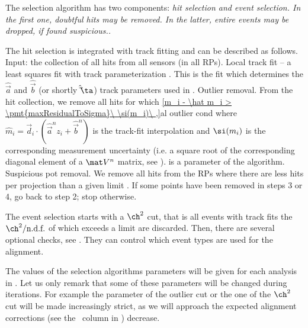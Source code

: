 The selection algorithm has two components: \em{hit selection} and \em{event selection}. In the first one, doubtful hits may be removed. In the latter, entire events may be dropped, if found suspicious..

The hit selection is integrated with track fitting and can be described as follows.
\bitm
\itm Input: the collection of all hits from all sensors (in all RPs).
\itm Local track fit -- a least squares fit with track parameterization . This is the fit which determines the $\hat\vec a$ and $\hat\vec b$ (or shortly $\hat\vec\ta$) track parameters used in .
\itm Outlier removal. From the hit collection, we remove all hits for which
\eqref{m_i - \hat m_i > \pmt{maxResidualToSigma}\ \si(m_i)\ ,}{al outlier cond}
where $\hat m_i = \vec d_i \cdot (\hat\vec a^n z_i + \hat\vec b^n)$ is the track-fit interpolation and $\si(m_i)$ is the corresponding measurement uncertainty (i.e. a square root of the corresponding diagonal element of a $\mat V^n$ matrix, see ).  is a parameter of the algorithm.
\itm Suspicious pot removal. We remove all hits from the RPs where there are less hits per projection than a given limit .
\itm If some points have been removed in steps 3 or 4, go back to step 2; stop otherwise.
\eitm

The event selection starts with a $\ch^2$ cut, that is all events with track fits the $\ch^2/\hbox{n.d.f.}$ of which exceeds a limit  are discarded. Then, there are several optional checks, see . They can control which event types are used for the alignment.


The values of the selection algorithms parameters will be given for each analysis in . Let us only remark that some of these parameters will be changed during iterations. For example the parameter of the outlier cut  or the one of the $\ch^2$ cut will be made increasingly strict, as we will approach the expected alignment corrections (see the \rhs~column in ) decrease.


